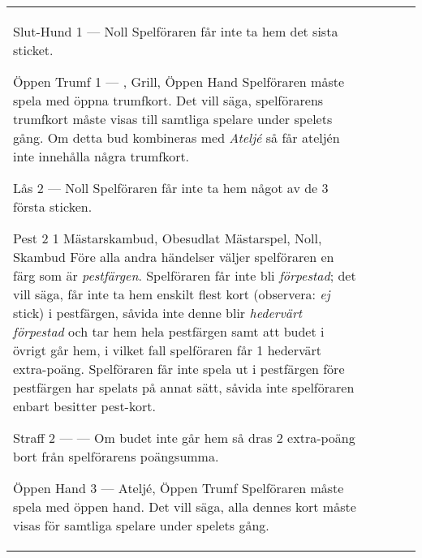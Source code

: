 \begin{center}
\begin{tabularx}{\textwidth}{
			l
			S[table-number-alignment=center, table-format=1.0]
			S[table-number-alignment=center, table-format=1.0]
			p{3cm}
			|X
		}
			\specialBidItem%
			{Slut-Hund}
			{1}
			{{---}}
			{Noll}
			{%
				Spelföraren får inte ta hem det sista sticket.
			}

			\specialBidItem%
			{Öppen Trumf}
			{1}
			{{---}}
			{\nonTrump, Grill, Öppen Hand}
			{%
				Spelföraren måste spela med öppna trumfkort. Det vill säga, spelförarens trumfkort måste visas till samtliga spelare under spelets gång. Om detta bud kombineras med \emph{Ateljé} så får ateljén inte innehålla några trumfkort.
			}

			\specialBidItem%
			{Lås}
			{2}
			{{---}}
			{Noll}
			{%
				Spelföraren får inte ta hem något av de 3 första sticken.
			}

			\specialBidItem%
			{Pest}
			{2}
			{1}
			{Mästarskambud, Obesudlat Mästarspel, Noll, Skambud}
			{%
				Före alla andra händelser väljer spelföraren en färg som är \emph{pestfärgen}. Spelföraren får inte bli \emph{förpestad}; det vill säga, får inte ta hem enskilt flest kort (observera: \emph{ej} stick) i pestfärgen, såvida inte denne blir \emph{hedervärt förpestad} och tar hem hela pestfärgen samt att budet i övrigt går hem, i vilket fall spelföraren får 1 hedervärt extra-poäng. Spelföraren får inte spela ut i pestfärgen före pestfärgen har spelats på annat sätt, såvida inte spelföraren enbart besitter pest-kort.
			}

			\specialBidItem%
			{Straff}
			{2}
			{{---}}
			{---}
			{%
				Om budet inte går hem så dras 2 extra-poäng bort från spelförarens poängsumma.
			}

			\specialBidItem%
			{Öppen Hand}
			{3}
			{{---}}
			{Ateljé, Öppen Trumf}
			{%
				Spelföraren måste spela med öppen hand. Det vill säga, alla dennes kort måste visas för samtliga spelare under spelets gång.
			}
		\end{tabularx}
	\end{center}

